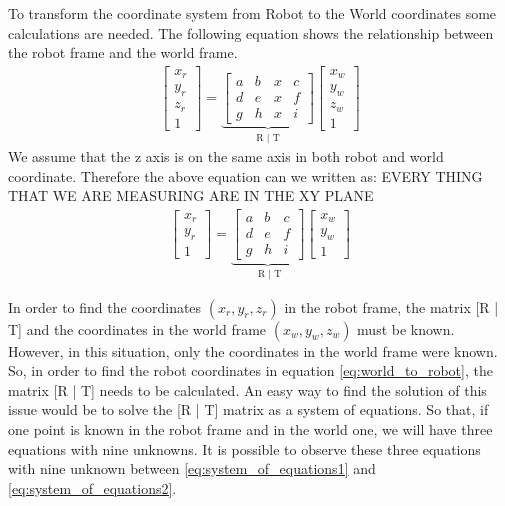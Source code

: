 To transform the coordinate system from Robot to the World coordinates some calculations are needed. The following equation shows the relationship between the robot frame and the world frame.
\begin{align*}
\begin{bmatrix}
x_r \\
y_r \\
z_r \\
1 
\end{bmatrix}
= \underbrace{\begin{bmatrix}
a & b & x & c \\
d & e & x & f \\
g & h & x & i 
\end{bmatrix}}_{\text{R | T}}
\begin{bmatrix}
x_w \\
y_w \\
z_w\\
1 
\end{bmatrix}
\end{align*}
We assume that the z axis is on the same axis in both robot and world coordinate. Therefore the above equation can we written as: EVERY THING THAT WE ARE MEASURING ARE IN THE XY PLANE
\begin{align}
\begin{bmatrix}
x_r \\
y_r \\
1 
\end{bmatrix}
= \underbrace{\begin{bmatrix}
a & b & c \\
d & e & f \\
g & h & i 
\end{bmatrix}}_{\text{    R   | T}}
\begin{bmatrix}
x_w \\
y_w \\
1 
\end{bmatrix}
\label{eq:world_to_robot}
\end{align}

In order to find the coordinates $(x_r,y_r,z_r)$ in the robot frame, the matrix [R | T] and the coordinates in the world frame $(x_w,y_w,z_w)$ must be known. However, in this situation, only  the coordinates in the world frame were known. So, in order to find the robot coordinates in equation \ref{eq:world_to_robot}, the matrix [R | T] needs to be calculated. An easy way to find the solution of this issue would be to solve the [R | T] matrix as a system of equations. So that, if one point is known in the robot frame and in the world one, we will have three equations with nine unknowns. It is possible to observe these three equations with nine unknown between \ref{eq:system_of_equations1} and \ref{eq:system_of_equations2}.
 
